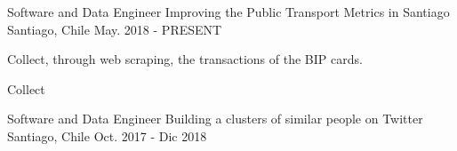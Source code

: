 

\begin{cventries}

  \cventry
    {Software and Data Engineer} %
    {Improving the Public Transport Metrics in Santiago} %
    {Santiago, Chile} %
    {May. 2018 - PRESENT} %
    {
      \begin{cvitems} %
        \item {Collect, through web scraping, the transactions of the BIP cards.}
        \item {Collect}
      \end{cvitems}
    }

  \cventry
    {Software and Data Engineer} %
    {Building a clusters of similar people on Twitter} %
    {Santiago, Chile} %
    {Oct. 2017 - Dic 2018} %
    {
      \begin{cvitems} %
        \item {}
      \end{cvitems}
    }

\end{cventries}
